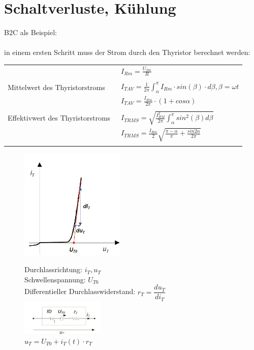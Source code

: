 	\section{Schaltverluste, Kühlung}
B2C als Beispiel:\\\\
in einem ersten Schritt muss der Strom durch den Thyristor berechnet werden:\\
\begin{tabular}{ll}
  &\ $I_{Rm} = \frac{U_{2m}}{R}$\\\\
  Mittelwert des Thyristorstroms &\ $I_{T AV} = \frac{1}{2\pi}\int_{\alpha}^{\pi}I_{Rm} \cdot sin(\beta) \cdot d\beta, \beta = \omega t$\\
  &\ $I_{T AV} = \frac{I_{Rm}}{2\pi} \cdot (1+cos\alpha)$\\\\
  Effektivwert des Thyristorstroms &\ $I_{T RMS} = \sqrt{\frac{I_{RM}^2}{2\pi}\int_{\alpha}^{\pi}sin^2(\beta)d\beta}$\\
  &\ $I_{T RMS} = \frac{I_{Rm}}{2}\sqrt{\frac{\pi - \alpha}{\pi}+\frac{sin2\alpha}{2\pi}}$\\\\
\end{tabular}

\begin{figure}[htbp]
  \begin{minipage}[t]{6cm}
    \vspace{0pt}
    \centering
    \includegraphics[width = 5cm]{./pictures/kennlinieThyristor} 
  \end{minipage}
  \hfill
  \begin{minipage}[t]{6cm}
    \vspace{0pt}
    Durchlassrichtung: $i_{T}, u_{T}$\\
    Schwellenspannung: $U_{T0}$\\
    Differentieller Durchlasswiderstand: $r_{T} = \dfrac{du_{T}}{di_{T}}$\\
    \includegraphics[width = 4cm]{./pictures/schemaThyristor}\\
    $u_{T} = U_{T0}+i_{T}(t) \cdot r_{T}$
  \end{minipage}
\end{figure}


